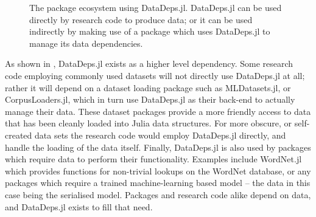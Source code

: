 \documentclass[twoside,11pt]{article}\usepackage{jmlr2e}
\begin{document}
\begin{figure}
	\centering
	\caption{The package ecosystem using DataDeps.jl. DataDeps.jl can be used directly by research code to produce data; or it can be used indirectly by making use of a package which uses DataDeps.jl to manage its data dependencies. \label{fig:eco}}
\end{figure}

As shown in , DataDeps.jl exists as a higher level dependency.
Some research code employing commonly used datasets will not directly use DataDeps.jl at all;
rather it will depend on a dataset loading package such as MLDatasets.jl,
or CorpusLoaders.jl, which in turn use DataDeps.jl as their back-end to actually manage their data.
These dataset packages provide a more friendly access to data that has been cleanly loaded into Julia data structures.
For more obscure, or self-created data sets the research code would employ DataDeps.jl directly, and handle the loading of the data itself.
Finally, DataDeps.jl is also used by packages which require data to perform their functionality.
Examples include WordNet.jl which provides functions for non-trivial lookups on the WordNet \citep{miller1995wordnet} database,
or any packages which require a trained machine-learning based model -- the data in this case being the serialised model.
Packages and research code alike depend on data, and DataDeps.jl exists to fill that need.
\end{document}
